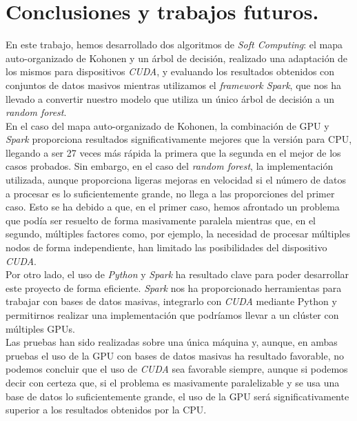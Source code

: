 \chapter{Conclusiones y trabajos futuros.}
En este trabajo, hemos desarrollado dos algoritmos de \textit{Soft Computing}: el mapa auto-organizado de Kohonen y un árbol de decisión, realizado una adaptación de los mismos para dispositivos \textit{CUDA}, y evaluando los resultados obtenidos con conjuntos de datos masivos mientras utilizamos el \textit{framework Spark}, que nos ha llevado a convertir nuestro modelo que utiliza un único árbol de decisión a un \textit{random forest}.\\

En el caso del mapa auto-organizado de Kohonen, la combinación de GPU y \textit{Spark} proporciona resultados significativamente mejores que la versión para CPU, llegando a ser 27 veces más rápida la primera que la segunda en el mejor de los casos probados. Sin embargo, en el caso del \textit{random forest}, la implementación utilizada, aunque proporciona ligeras mejoras en velocidad si el número de datos a procesar es lo suficientemente grande, no llega a las proporciones del primer caso. Esto se ha debido a que, en el primer caso, hemos afrontado un problema que podía ser resuelto de forma masivamente paralela mientras que, en el segundo, múltiples factores como, por ejemplo, la necesidad de procesar múltiples nodos de forma independiente, han limitado las posibilidades del dispositivo \textit{CUDA}. \\

Por otro lado, el uso de \textit{Python} y \textit{Spark} ha resultado clave para poder desarrollar este proyecto de forma eficiente. \textit{Spark} nos ha proporcionado herramientas para trabajar con bases de datos masivas, integrarlo con \textit{CUDA} mediante Python y permitirnos realizar una implementación que podríamos llevar a un clúster con múltiples GPUs.\\

Las pruebas han sido realizadas sobre una única máquina y, aunque, en ambas pruebas el uso de la GPU con bases de datos masivas ha resultado favorable, no podemos concluir que el uso de \textit{CUDA} sea favorable siempre, aunque si podemos decir con certeza que, si el problema es masivamente paralelizable y se usa una base de datos lo suficientemente grande, el uso de la GPU será significativamente superior a los resultados obtenidos por la CPU.\\

